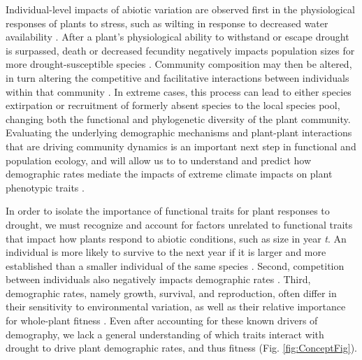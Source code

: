 \documentclass[12pt, letterpaper]{article}
\begin{document}
Individual-level impacts of abiotic variation are observed first in the physiological responses of plants to stress, such as wilting in response to decreased water availability \citep{Bartlett2012, Bartletta2016TheDrought}. After a plant's physiological ability to withstand or escape drought is surpassed, death or decreased fecundity negatively impacts population sizes for more drought-susceptible species \citep{Koerner2014, McDowell2008MechanismsDrought}. Community composition may then be altered, in turn altering the competitive and facilitative interactions between individuals within that community \citep{Ploughe2019CommunityInteractions, Harrison2015Climate-drivenCommunity}. In extreme cases, this process can lead to either species extirpation or recruitment of formerly absent species to the local species pool, changing both the functional and phylogenetic diversity of the plant community.  Evaluating the underlying demographic mechanisms and plant-plant interactions that are driving community dynamics is an important next step in functional and population ecology, and will allow us to to understand and predict how demographic rates mediate the impacts of extreme climate impacts on plant phenotypic traits \citep{Laughlin2020TheFitness,Ploughe2019CommunityInteractions,Hoover2014ResistanceExtremes,Salguero-Gomez2012}.   

In order to isolate the importance of functional traits for plant responses to drought, we must recognize and account for factors unrelated to functional traits that impact how plants respond to abiotic conditions, such as size in year \textit{t}. An individual is more likely to survive to the next year if it is larger and more established than a smaller individual of the same species \citep{Tredennick2017}. Second, competition between individuals also negatively impacts demographic rates \citep{Adler2012}. Third, demographic rates, namely growth, survival, and reproduction, often differ in their sensitivity to environmental variation, as well as their relative importance for whole-plant fitness \citep{Laughlin2020TheFitness,Dibner2019}. Even after accounting for these known drivers of demography, we lack a general understanding of which traits interact with drought to drive plant demographic rates, and thus fitness \citep{Laughlin2018,Laughlin2020TheFitness}(Fig. \ref{fig:ConceptFig}). 
\end{document}
